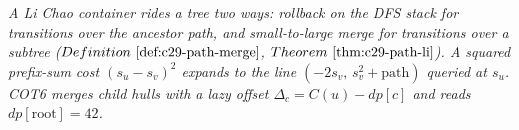 \begin{recallbox}
\emph{A Li Chao container rides a tree two ways: rollback on the DFS stack for
transitions over the ancestor path, and small-to-large \emph{merge} for
transitions over a subtree (\(\defref{c29-path-merge}\), \(\thmref{c29-path-li}\)).
A squared prefix-sum cost \((s_u-s_v)^2\) expands to the line
\((-2s_v,\,s_v^2+\text{path})\) queried at \(s_u\).  COT6 merges child hulls with
a lazy offset \(\Delta_c=C(u)-\mathit{dp}[c]\) and reads \(\mathit{dp}[\text{root}]=42\).}
\end{recallbox}
